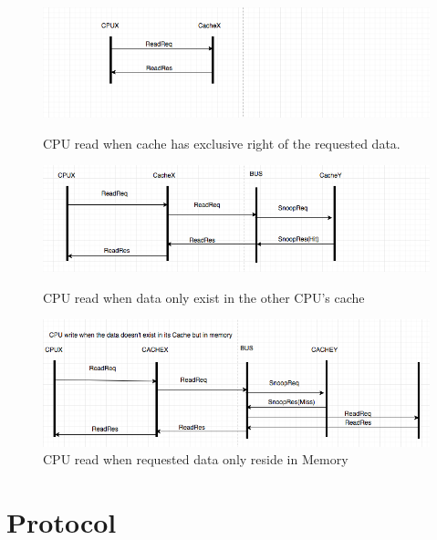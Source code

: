 \documentclass[12pt,frontmatter,copyright,thesis]{usfmanus}
\begin{document}
\begin{appendix}
\begin{figure}[h!] 
\centering
 \includegraphics[width=5In]{y5.png}
  \caption{\footnotesize CPU read when cache has exclusive right of the requested data. }
 \label{y4}
 \centering
 \includegraphics[width=5In]{y6.png}
 \caption{\footnotesize CPU read when data only exist in the other CPU's cache }
 \label{y5}
 \centering
 \includegraphics[width=5In]{y7.png}
 \caption{\footnotesize CPU read when requested data only reside in Memory }
 \label{y6}

\end{figure}



\section{Protocol}


\end{appendix}
\end{document}
